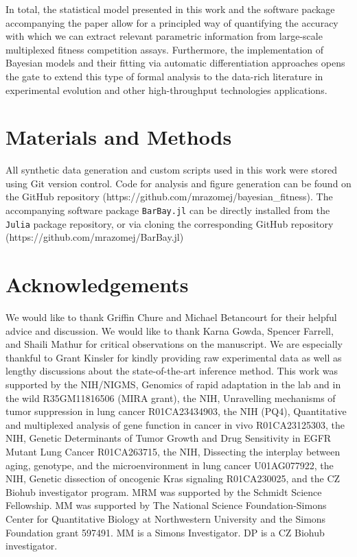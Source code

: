 \documentclass[
]{scrartcl}
\begin{document}
\begin{refsegment}
In total, the statistical model presented in this work and the software
package accompanying the paper allow for a principled way of quantifying
the accuracy with which we can extract relevant parametric information
from large-scale multiplexed fitness competition assays. Furthermore,
the implementation of Bayesian models and their fitting via automatic
differentiation approaches opens the gate to extend this type of formal
analysis to the data-rich literature in experimental evolution and other
high-throughput technologies applications.

\hypertarget{materials-and-methods}{%
\section*{Materials and Methods}\label{materials-and-methods}}

All synthetic data generation and custom scripts used in this work were
stored using Git version control. Code for analysis and figure
generation can be found on the GitHub repository
(https://github.com/mrazomej/bayesian\_fitness). The accompanying
software package \texttt{BarBay.jl} can be directly installed from the
\texttt{Julia} package repository, or via cloning the corresponding
GitHub repository (https://github.com/mrazomej/BarBay.jl)

\hypertarget{acknowledgements}{%
\section*{Acknowledgements}\label{acknowledgements}}

We would like to thank Griffin Chure and Michael Betancourt for their
helpful advice and discussion. We would like to thank Karna Gowda,
Spencer Farrell, and Shaili Mathur for critical observations on the
manuscript. We are especially thankful to Grant Kinsler for kindly
providing raw experimental data as well as lengthy discussions about the
state-of-the-art inference method. This work was supported by the
NIH/NIGMS, Genomics of rapid adaptation in the lab and in the wild
R35GM11816506 (MIRA grant), the NIH, Unravelling mechanisms of tumor
suppression in lung cancer R01CA23434903, the NIH (PQ4), Quantitative
and multiplexed analysis of gene function in cancer in vivo
R01CA23125303, the NIH, Genetic Determinants of Tumor Growth and Drug
Sensitivity in EGFR Mutant Lung Cancer R01CA263715, the NIH, Dissecting
the interplay between aging, genotype, and the microenvironment in lung
cancer U01AG077922, the NIH, Genetic dissection of oncogenic Kras
signaling R01CA230025, and the CZ Biohub investigator program. MRM was
supported by the Schmidt Science Fellowship. MM was supported by The
National Science Foundation-Simons Center for Quantitative Biology at
Northwestern University and the Simons Foundation grant 597491. MM is a
Simons Investigator. DP is a CZ Biohub investigator.

\printbibliography[segment=\therefsegment]
\end{refsegment}
\end{document}
